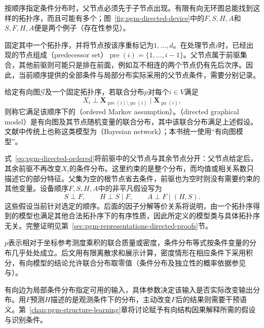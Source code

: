 按顺序指定条件分布时，父节点必须先于子节点出现。有限有向无环图总能找到这样的拓扑序，而且可能有多个；图~\ref{fig:pgm-directed-device}中的$F,S,H,A$和$S,F,H,A$便是两个例子（存在性参见）。

固定其中一个拓扑序，并将节点按该序重标记为$1,\ldots,d$。在处理节点$i$时，已经出现的节点组成（predecessor set）$\operatorname{pre}(i)=\{1,\ldots,i-1\}$。父节点属于前驱集合，其他前驱则可能只是排在前面，例如互不相连的两个节点仍有先后次序。因此，当前顺序提供的全部条件与局部分布实际采用的父节点条件，需要分别记录。

\begin{definition}[有序Markov假设与有向图模型]
  \label{def:pgm-directed-ordered}
  给定有向图$\mathcal{G}$及一个固定拓扑序，若联合分布$p$对每个$i\in V$满足
  \begin{equation}
    X_i\perp
    \bm{X}_{\operatorname{pre}(i)\setminus\operatorname{pa}(i)}
    \mid\bm{X}_{\operatorname{pa}(i)},
    \label{eq:pgm-directed-ordered}
  \end{equation}
  则称它满足该顺序下的（ordered Markov assumption）。（directed graphical model）是有向图及其节点随机变量的联合分布，其中该联合分布满足上述假设。文献中传统上也称这类模型为（Bayesian network）；本书统一使用“有向图模型”。
\end{definition}

式~\eqref{eq:pgm-directed-ordered}将前驱中的父节点与其余节点分开：父节点给定后，其余前驱不再改变$X_i$的条件分布。这里约束的是整个分布，而均值或相关系数只描述它的部分特征。父集为空的根节点省去条件，前驱也为空时则没有需要约束的其他变量。设备顺序$F,S,H,A$中的非平凡假设写为
\[
  S\perp F,\qquad H\perp S\mid F,\qquad A\perp F\mid(H,S).
\]
这些假设当前针对选定的顺序。后面的因子分解等价关系将说明，由一个拓扑序得到的模型也满足其他合法拓扑序下的有序性质，因此所定义的模型类与具体拓扑序无关。完整证明见第~\ref{sec:pgm-representations-directed-proofs}节。

$p$表示相对于坐标参考测度乘积的联合质量或密度，条件分布等式按条件变量的分布几乎处处成立。后文用有限离散求和展示计算，密度情形在相应条件下采用积分，有向模型的结论允许联合分布取零值（条件分布及独立性的概率依据参见与）。

有向边为局部条件分布指定可用的输入，具体参数决定该输入是否实际改变输出分布。用$F$预测$H$描述的是观测条件下的分布，主动改变$F$后的结果则需要干预语义。第~\ref{chap:pgm-structure-learning}章将讨论赋予有向结构因果解释所需的假设与识别条件。

